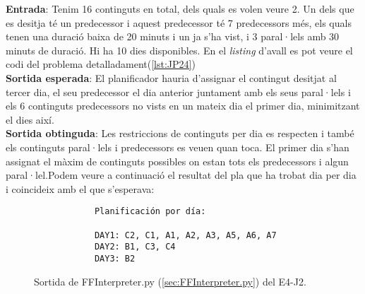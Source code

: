 \documentclass[a4paper]{article}
\begin{document}
	\noindent \textbf{Entrada}: Tenim 16 continguts en total, dels quals es volen veure 2. Un dels que es desitja té un predecessor i aquest predecessor té 7 predecessors més, els quals tenen una duració baixa de 20 minuts i un ja s'ha vist, i 3 paral·lels amb 30 minuts de duració. Hi ha 10 dies disponibles. En el \textit{listing} d'avall es pot veure el codi del problema detalladament(\ref{lst:JP24})\\
	
	\noindent \textbf{Sortida esperada}: El planificador hauria d'assignar el contingut desitjat al tercer dia, el seu predecessor el dia anterior juntament amb els seus paral·lels i els 6 continguts predecessors no vists en un mateix dia el primer dia, minimitzant el dies així.\\
	
	\noindent \textbf{Sortida obtinguda}: Les restriccions de continguts per dia es respecten i també els continguts paral·lels i predecessors es veuen quan toca. El primer dia s'han assignat el màxim de continguts possibles on estan tots els predecessors i algun paral·lel.Podem veure a continuació el resultat del pla que ha trobat dia per dia i coincideix amb el que s'esperava:
	
	\begin{figure}[H]
		\centering
		\begin{verbatim}
			Planificación por día:
			
			DAY1: C2, C1, A1, A2, A3, A5, A6, A7
			DAY2: B1, C3, C4
			DAY3: B2
		\end{verbatim}
		\caption{Sortida de FFInterpreter.py (\ref{sec:FFInterpreter.py}) del E4-J2.}
	\end{figure}
	
	
	
\end{document}
